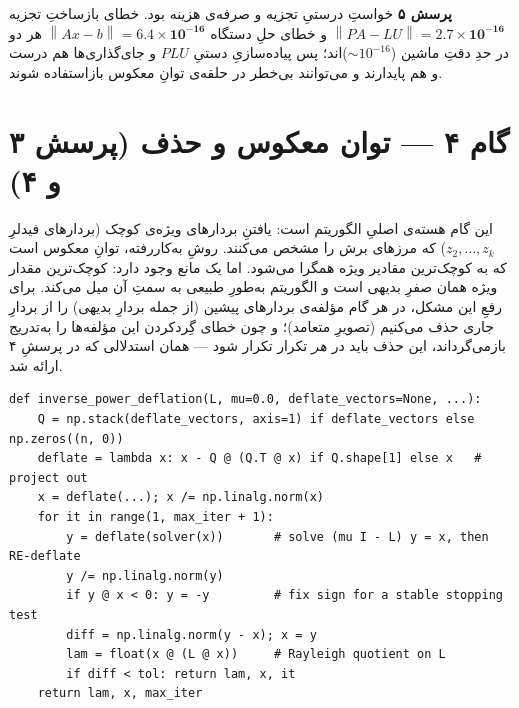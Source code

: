 \documentclass[13pt]{extarticle}
\newenvironment{pycode}{\begin{latin}\lstset{style=py}}{\end{latin}}
\newcommand{\norm}[1]{\left\lVert #1 \right\rVert}
\begin{document}
\begin{qlink}
\textbf{پرسش ۵} خواستِ درستیِ تجزیه و صرفه‌ی هزینه بود. خطای بازساختِ تجزیه $\norm{PA-LU}=\mathbf{2.7\times10^{-16}}$ و خطای حلِ دستگاه $\norm{Ax-b}=\mathbf{6.4\times10^{-16}}$ هر دو در حدِ دقتِ ماشین ($\sim10^{-16}$)‌اند؛ پس پیاده‌سازیِ دستیِ $PLU$ و جای‌گذاری‌ها هم درست و هم پایدارند و می‌توانند بی‌خطر در حلقه‌ی توانِ معکوس بازاستفاده شوند.
\end{qlink}

\section{گام ۴ --- توان معکوس و حذف (پرسش ۳ و ۴)}

این گام هسته‌ی اصلیِ الگوریتم است: یافتنِ بردارهای ویژه‌ی کوچک (بردارهای فیدلرِ $z_2,\dots,z_k$) که مرزهای برش را مشخص می‌کنند. روشِ به‌کار‌رفته، توانِ معکوس است که به کوچک‌ترین مقادیر ویژه همگرا می‌شود. اما یک مانع وجود دارد: کوچک‌ترین مقدار ویژه همان صفرِ بدیهی است و الگوریتم به‌طورِ طبیعی به سمتِ آن میل می‌کند. برای رفعِ این مشکل، در هر گام مؤلفه‌ی بردارهای پیشین (از جمله بردارِ بدیهی) را از بردارِ جاری حذف می‌کنیم (تصویرِ متعامد)؛ و چون خطای گِرد‌کردن این مؤلفه‌ها را به‌تدریج بازمی‌گرداند، این حذف باید در \emph{هر} تکرار تکرار شود --- همان استدلالی که در پرسشِ ۴ ارائه شد.

\begin{pycode}
\begin{lstlisting}
def inverse_power_deflation(L, mu=0.0, deflate_vectors=None, ...):
    Q = np.stack(deflate_vectors, axis=1) if deflate_vectors else np.zeros((n, 0))
    deflate = lambda x: x - Q @ (Q.T @ x) if Q.shape[1] else x   # project out
    x = deflate(...); x /= np.linalg.norm(x)
    for it in range(1, max_iter + 1):
        y = deflate(solver(x))       # solve (mu I - L) y = x, then RE-deflate
        y /= np.linalg.norm(y)
        if y @ x < 0: y = -y         # fix sign for a stable stopping test
        diff = np.linalg.norm(y - x); x = y
        lam = float(x @ (L @ x))     # Rayleigh quotient on L
        if diff < tol: return lam, x, it
    return lam, x, max_iter
\end{lstlisting}
\end{pycode}
\end{document}
